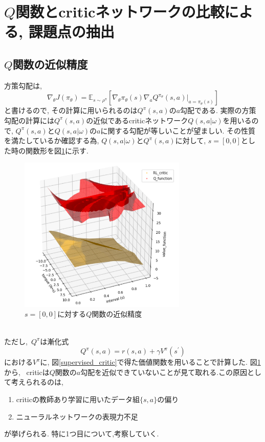 \documentclass{jsarticle}
\newcommand{\expect}{\mathbb{E}}
\begin{document}
\section{$Q$関数とcriticネットワークの比較による, 課題点の抽出}
\subsection{$Q$関数の近似精度}
方策勾配は,
\[\nabla_{\theta}J(\pi_{\theta}) = \expect_{s\sim\rho^{\pi}}[
	\nabla_{\theta}\pi_{\theta}(s)\nabla_{a}Q^{\pi_{\theta}}(s, a)|_{a=\pi_{\theta}(s)}]\]
と書けるので, その計算に用いられるのは$Q^{\pi}(s,a)$の$a$勾配である. 実際の方策勾配の計算には$Q^{\pi}(s,a)$の近似であるcriticネットワーク$Q(s,a|\omega)$を用いるので, $Q^{\pi}(s,a)$と$Q(s,a|\omega)$の$a$に関する勾配が等しいことが望ましい. その性質を満たしているか確認する為, $Q(s,a|\omega)とQ^{\pi}(s,a)$に対して, $s=[0,0]$とした時の関数形を図\ref{critic_q_const_s}に示す.
\begin{figure}[h]
	\centering
 	\includegraphics[width=8cm]{critic_q_const_s.png}
 	\caption{$s=[0,0]$に対する$Q$関数の近似精度} \label{critic_q_const_s}
\end{figure}\\
ただし,~$Q^{\pi}$は漸化式
\[Q^{\pi}(s,a) = r(s,a)+\gamma V^{\pi}(s^{\prime})\]
における$V^{\pi}$に, 図\ref{supervised_critic}で得た価値関数を用いることで計算した. 図\ref{critic_q_const_s}から, ~criticは$Q$関数の$a$勾配を近似できていないことが見て取れる.この原因として考えられるのは,
\begin{enumerate}
	\item criticの教師あり学習に用いたデータ組$\{s,a\}$の偏り
	\item ニューラルネットワークの表現力不足
\end{enumerate}
が挙げられる. 特に1つ目について,考察していく.
\end{document}
